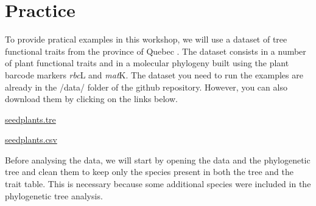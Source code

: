 \documentclass[
]{book}
\newenvironment{Shaded}{\begin{snugshade}}{\end{snugshade}}
\newcommand{\AttributeTok}[1]{\textcolor[rgb]{0.13,0.29,0.53}{#1}}
\newcommand{\CommentTok}[1]{\textcolor[rgb]{0.56,0.35,0.01}{\textit{#1}}}
\newcommand{\ConstantTok}[1]{\textcolor[rgb]{0.56,0.35,0.01}{#1}}
\newcommand{\FloatTok}[1]{\textcolor[rgb]{0.00,0.00,0.81}{#1}}
\newcommand{\FunctionTok}[1]{\textcolor[rgb]{0.13,0.29,0.53}{\textbf{#1}}}
\newcommand{\NormalTok}[1]{#1}
\newcommand{\OtherTok}[1]{\textcolor[rgb]{0.56,0.35,0.01}{#1}}
\newcommand{\SpecialCharTok}[1]{\textcolor[rgb]{0.81,0.36,0.00}{\textbf{#1}}}
\newcommand{\StringTok}[1]{\textcolor[rgb]{0.31,0.60,0.02}{#1}}
\begin{document}
\section{Practice}\label{practice}

To provide pratical examples in this workshop, we will use a dataset of tree functional traits from the province of Quebec \citep{paquette2015explaining}. The dataset consists in a number of plant functional traits and in a molecular phylogeny built using the plant barcode markers \emph{rbc}L and \emph{mat}K. The dataset you need to run the examples are already in the /data/ folder of the github repository. However, you can also download them by clicking on the links below.

\href{https://simjoly.github.io/ComparativeMethods-HalfDayWorkshop/data/seedplants.tre}{seedplants.tre}

\href{https://simjoly.github.io/ComparativeMethods-HalfDayWorkshop/data/seedplants.csv}{seedplants.csv}

Before analysing the data, we will start by opening the data and the phylogenetic tree and clean them to keep only the species present in both the tree and the trait table. This is necessary because some additional species were included in the phylogenetic tree analysis.

\begin{Shaded}
\end{Shaded}
\end{document}
